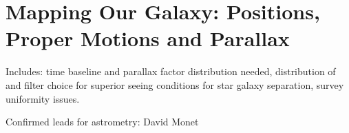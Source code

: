 \chapter[Astrometry]{Mapping Our Galaxy: Positions, Proper Motions and Parallax}
\label{chp:astrometry}


Includes: time baseline and parallax factor distribution needed,
distribution of and filter choice for superior seeing conditions for
star galaxy separation, survey uniformity issues.

Confirmed leads for astrometry: David Monet
